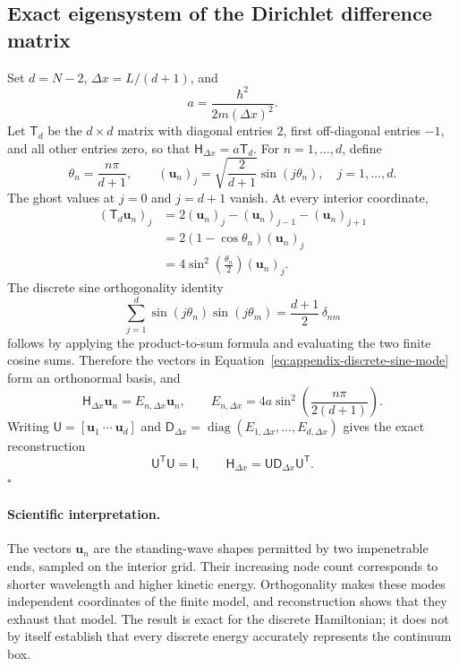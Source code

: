 \documentclass[11pt]{article}
\newcommand{\mat}[1]{\mathsf{#1}}
\newcommand{\vect}[1]{\boldsymbol{#1}}
\begin{document}
\subsection{Exact eigensystem of the Dirichlet difference matrix}

Set $d=N-2$, $\Delta x=L/(d+1)$, and
\begin{equation}
 a=\frac{\hbar^2}{2m(\Delta x)^2}.
\end{equation}
Let $\mat{T}_d$ be the $d\times d$ matrix with diagonal entries $2$, first
off-diagonal entries $-1$, and all other entries zero, so that
$\mat{H}_{\Delta x}=a\mat{T}_d$. For $n=1,\ldots,d$, define
\begin{equation}
 \theta_n=\frac{n\pi}{d+1},
 \qquad
 (\vect{u}_n)_j
 =\sqrt{\frac{2}{d+1}}\sin(j\theta_n),
 \quad j=1,\ldots,d.
 \label{eq:appendix-discrete-sine-mode}
\end{equation}
The ghost values at $j=0$ and $j=d+1$ vanish. At every interior coordinate,
\begin{align}
 (\mat{T}_d\vect{u}_n)_j
 &=2(\vect{u}_n)_j-(\vect{u}_n)_{j-1}-(\vect{u}_n)_{j+1} \\
 &=2(1-\cos\theta_n)(\vect{u}_n)_j \\
 &=4\sin^2\!\left(\frac{\theta_n}{2}\right)(\vect{u}_n)_j.
\end{align}
The discrete sine orthogonality identity
\begin{equation}
 \sum_{j=1}^{d}\sin(j\theta_n)\sin(j\theta_m)
 =\frac{d+1}{2}\,\delta_{nm}
 \label{eq:appendix-discrete-sine-orthogonality}
\end{equation}
follows by applying the product-to-sum formula and evaluating the two finite cosine
sums. Therefore the vectors in Equation~\eqref{eq:appendix-discrete-sine-mode} form an
orthonormal basis, and
\begin{equation}
 \mat{H}_{\Delta x}\vect{u}_n
 =E_{n,\Delta x}\vect{u}_n,
 \qquad
 E_{n,\Delta x}
 =4a\sin^2\!\left(\frac{n\pi}{2(d+1)}\right).
 \label{eq:appendix-discrete-eigenpair}
\end{equation}
Writing $\mat{U}=[\vect{u}_1\ \cdots\ \vect{u}_d]$ and
$\mat{D}_{\Delta x}=\operatorname{diag}(E_{1,\Delta x},\ldots,E_{d,\Delta x})$
gives the exact reconstruction
\begin{equation}
 \mat{U}^{\mathsf T}\mat{U}=\mat{I},
 \qquad
 \mat{H}_{\Delta x}
 =\mat{U}\mat{D}_{\Delta x}\mat{U}^{\mathsf T}.
 \label{eq:appendix-exact-reconstruction}
\end{equation}
\hfill$\square$

\paragraph{Scientific interpretation.}
The vectors $\vect{u}_n$ are the standing-wave shapes permitted by two impenetrable
ends, sampled on the interior grid. Their increasing node count corresponds to
shorter wavelength and higher kinetic energy. Orthogonality makes these modes
independent coordinates of the finite model, and reconstruction shows that they
exhaust that model. The result is exact for the discrete Hamiltonian; it does not by
itself establish that every discrete energy accurately represents the continuum box.
\end{document}
